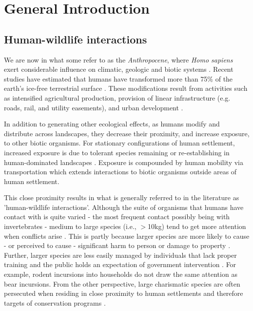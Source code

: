 \chapter{General Introduction}\label{sec:intro}
\newpage

\section{Human-wildlife interactions}

We are now in what some refer to as the \textit{Anthropocene}, where \textit{Homo sapiens} exert considerable influence on climatic, geologic and biotic systems \citep{crut06}. Recent studies have estimated that humans have transformed more than 75\% of the earth's ice-free terrestrial surface \citep{elli08}. These modifications result from activities such as intensified agricultural production, provision of linear infrastructure (e.g. roads, rail, and utility easements), and urban development \citep{vito97,sand02,fole05}.

In addition to generating other ecological effects, as humans modify and distribute across landscapes, they decrease their proximity, and increase exposure, to other biotic organisms. For stationary configurations of human settlement, increased exposure is due to tolerant species remaining or re-establishing in human-dominated landscapes \citep{soul16}. Exposure is compounded by human mobility via transportation which extends interactions to biotic organisms outside areas of human settlement.

This close proximity results in what is generally referred to in the literature as 'human-wildlife interactions'. Although the suite of organisms that humans have contact with is quite varied - the most frequent contact possibly being with invertebrates - medium to large species (i.e., $>$10kg) tend to get more attention when conflicts arise \citep{seor16}. This is partly because larger species are more likely to cause - or perceived to cause - significant harm to person or damage to property \citep{cono01}. Further, larger species are less easily managed by individuals that lack proper training and the public holds an expectation of government intervention \citep{reit99}. For example, rodent incursions into households do not draw the same attention as bear incursions. From the other perspective, large charismatic species are often persecuted when residing in close proximity to human settlements and therefore targets of conservation programs \citep{trev03}.

